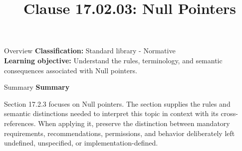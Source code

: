 \documentclass[10pt,letterpaper]{article}
\title{Clause 17.02.03: Null Pointers}
\author{}
\date{}
\begin{document}
\maketitle
\begin{CornellOverviewBox}{Overview}
\textbf{Classification:} Standard library - Normative\\[2pt]
\textbf{Learning objective:} Understand the rules, terminology, and semantic consequences associated with Null pointers.
\end{CornellOverviewBox}\begin{CornellSummaryBox}{Summary}
{\sffamily\bfseries\color{Accent} Summary}\par\vspace{3pt}Section 17.2.3 focuses on Null pointers. The section supplies the rules and semantic distinctions needed to interpret this topic in context with its cross-references. When applying it, preserve the distinction between mandatory requirements, recommendations, permissions, and behavior deliberately left undefined, unspecified, or implementation-defined.
\end{CornellSummaryBox}
\end{document}
